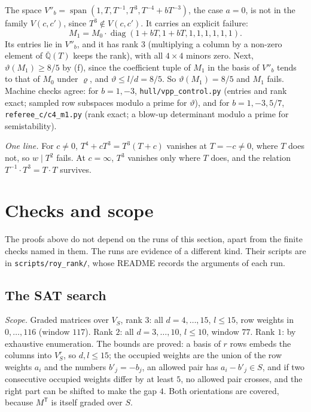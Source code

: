 \documentclass[11pt,a4paper]{article}
\theoremstyle{plain}
\theoremstyle{definition}
\newcommand{\Qbar}{\overline{\mathbb{Q}}}
\newcommand{\spn}{\operatorname{span}}
\newcommand{\vth}{\vartheta}
\newcommand{\scr}[1]{\nolinkurl{#1}}
\begin{document}
The space $V''_{b}=\spn(1,T,T^{-1},T^{3},T^{-4}+bT^{-3})$, the case $a=0$, is not in the family $V(c,c')$, since $T^{3}\notin V(c,c')$. It carries an explicit failure:
\[
M_{1}=M_{0}\cdot\operatorname{diag}(1+bT,1+bT,1,1,1,1,1,1).
\]
Its entries lie in $V''_{b}$, and it has rank $3$ (multiplying a column by a non-zero element of $\Qbar(T)$ keeps the rank), with all $4\times4$ minors zero. Next, $\vth(M_{1})\ge8/5$ by (f), since the coefficient tuple of $M_{1}$ in the basis of $V''_{b}$ tends to that of $M_{0}$ under $\varrho$, and $\vth\le l/d=8/5$. So $\vth(M_{1})=8/5$ and $M_{1}$ fails. Machine checks agree: for $b=1,-3$, \scr{hull/vpp_control.py} (entries and rank exact; sampled row subspaces modulo a prime for $\vth$), and for $b=1,-3,5/7$, \scr{referee_c/c4_m1.py} (rank exact; a blow-up determinant modulo a prime for semistability).

\emph{One line.} For $c\neq0$, $T^{4}+cT^{3}=T^{3}(T+c)$ vanishes at $T=-c\neq0$, where $T$ does not, so $w\mid T^{2}$ fails. At $c=\infty$, $T^{3}$ vanishes only where $T$ does, and the relation $T^{-1}\cdot T^{3}=T\cdot T$ survives.

\section{Checks and scope}\label{sec:checks}

The proofs above do not depend on the runs of this section, apart from the finite checks named in them. The runs are evidence of a different kind. Their scripts are in \scr{scripts/roy_rank/}, whose README records the arguments of each run.

\subsection{The SAT search}

\emph{Scope.} Graded matrices over $V_{S}$, rank $3$: all $d=4,\dots,15$, $l\le15$, row weights in $0,\dots,116$ (window $117$). Rank $2$: all $d=3,\dots,10$, $l\le10$, window $77$. Rank $1$: by exhaustive enumeration. The bounds are proved: a basis of $r$ rows embeds the columns into $V_{S}^{r}$, so $d,l\le15$; the occupied weights are the union of the row weights $a_{i}$ and the numbers $b'_{j}=-b_{j}$, an allowed pair has $a_{i}-b'_{j}\in S$, and if two consecutive occupied weights differ by at least $5$, no allowed pair crosses, and the right part can be shifted to make the gap $4$. Both orientations are covered, because $M^{\mathsf T}$ is itself graded over $S$.
\end{document}
